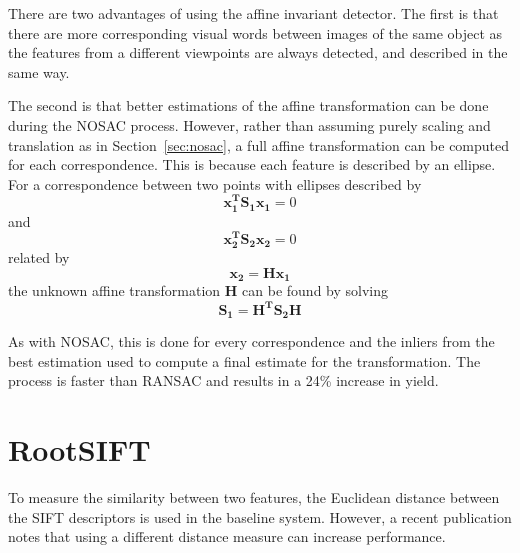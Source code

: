 \documentclass[11pt, onecolumn, a4paper, final]{report} %
\begin{document}
There are two advantages of using the affine invariant detector. The first is that there are more corresponding visual words between images of the same object as the features from a different viewpoints are always detected, and described in the same way. 

The second is that better estimations of the affine transformation can be done during the NOSAC process. However, rather than assuming purely scaling and translation as in Section~\ref{sec:nosac}, a full affine transformation can be computed for each correspondence. This is because each feature is described by an ellipse. For a correspondence between two points with ellipses described by
\begin{equation}
\mathbf{x_1^T}\mathbf{S_1}\mathbf{x_1}= 0
\label{eqn:ellipse1}
\end{equation} 
and
\begin{equation}
\mathbf{x_2^T}\mathbf{S_2}\mathbf{x_2}= 0
\label{eqn:ellipse2}
\end{equation} 
related by
\begin{equation}
\mathbf{x_2} = \mathbf{H}\mathbf{x_1}
\label{eqn:elaffine}
\end{equation} 
the unknown affine transformation $\mathbf{H}$ can be found by solving
\begin{equation}
\mathbf{S_1} = \mathbf{H^T}\mathbf{S_2}\mathbf{H}
\label{eqn:elaffine}
\end{equation} 

As with NOSAC, this is done for every correspondence and the inliers from the best estimation used to compute a final estimate for the transformation. The process is faster than RANSAC and results in a 24\% increase in yield.


\section{RootSIFT}
\label{sec:rootsift}
To measure the similarity between two features, the Euclidean distance between the SIFT descriptors is used in the baseline system. However, a recent publication \cite{rootsift12} notes that using a different distance measure can increase performance.
\end{document}
